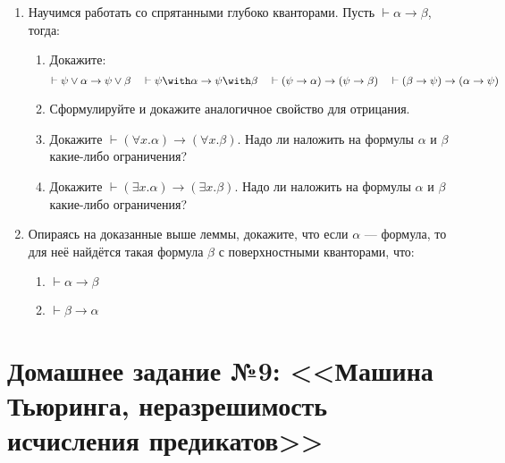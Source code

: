 \documentclass[10pt,a4paper,oneside]{article}
\begin{document}
\begin{enumerate}
\item Научимся работать со спрятанными глубоко кванторами. Пусть $\vdash\alpha\rightarrow\beta$, тогда:
\begin{enumerate}
\item Докажите: $$\vdash\psi\vee\alpha \rightarrow \psi\vee\beta\quad\vdash\psi\with\alpha \rightarrow \psi\with\beta\quad
\vdash(\psi\rightarrow\alpha) \rightarrow (\psi\rightarrow\beta)\quad\vdash(\beta\rightarrow\psi) \rightarrow (\alpha\rightarrow\psi)$$
\item Сформулируйте и докажите аналогичное свойство для отрицания.
\item Докажите $\vdash(\forall x.\alpha)\rightarrow(\forall x.\beta)$. 
Надо ли наложить на формулы $\alpha$ и $\beta$ какие-либо ограничения?
\item Докажите $\vdash(\exists x.\alpha)\rightarrow(\exists x.\beta)$. 
Надо ли наложить на формулы $\alpha$ и $\beta$ какие-либо ограничения?
\end{enumerate}

\item Опираясь на доказанные выше леммы, докажите, что
если $\alpha$ --- формула, то для неё найдётся такая формула $\beta$ с поверхностными кванторами, что:
\begin{enumerate}
\item $\vdash\alpha\rightarrow\beta$
\item $\vdash\beta\rightarrow\alpha$
\end{enumerate}

\end{enumerate}

\section*{Домашнее задание №9: <<Машина Тьюринга, неразрешимость исчисления предикатов>>}
\end{document}
